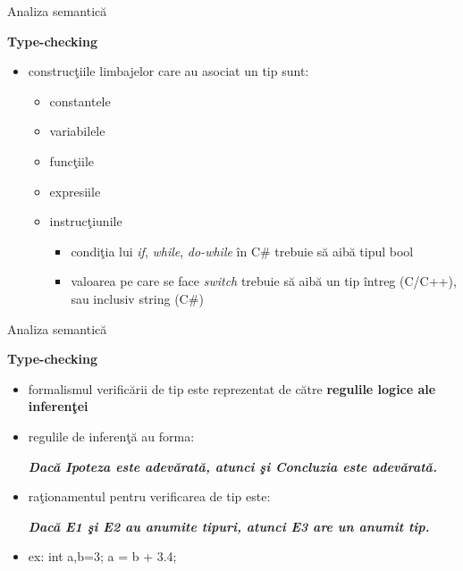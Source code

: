 \documentclass[pdf]{beamer}
\begin{document}
\begin{frame}{Analiza semantică}

\textbf{Type-checking}

\begin{itemize}
\item
construcţiile limbajelor care au asociat un tip sunt:

\begin{itemize}
\item
constantele

\item
variabilele

\item
funcţiile

\item
expresiile

\item
instrucţiunile
\begin{itemize}
\item
condiţia lui \textit{if}, \textit{while}, \textit{do-while} în C\# trebuie să aibă tipul bool
\item
valoarea pe care se face \textit{switch} trebuie să aibă un tip întreg (C/C++), sau inclusiv string (C\#)
\end{itemize}
\end{itemize}
\end{itemize}
\end{frame}



\begin{frame}{Analiza semantică}

\textbf{Type-checking}

\begin{itemize}
\item
formalismul verificării de tip este reprezentat de către \textbf{regulile logice ale inferenţei}

\item
regulile de inferenţă au forma:

\textit{\textbf{Dacă Ipoteza este adevărată, atunci şi Concluzia este adevărată.}}

\item
raţionamentul pentru verificarea de tip este:

\textit{\textbf{Dacă E1 şi E2 au anumite tipuri, atunci E3 are un anumit tip.}}

\item
ex: int a,b=3; a = b + 3.4;
\end{itemize}
\end{frame}
\end{document}
